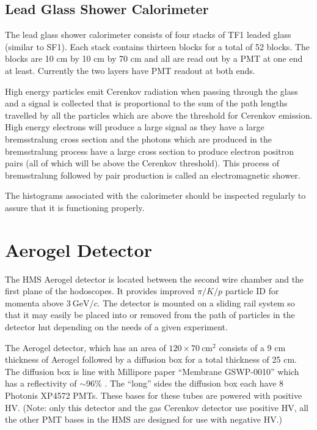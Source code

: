 \subsection{Lead Glass Shower Calorimeter}

The lead glass shower calorimeter consists of four stacks of
TF1 leaded glass (similar to SF1). Each stack contains thirteen
blocks for a total of 52 blocks. The blocks are 10 cm by 10 cm by 70
cm and all are read out by a PMT at one end at least.  Currently the
two layers have PMT readout at both ends.

High energy particles
emit Cerenkov radiation when passing through the glass and a signal
is collected that is proportional to the sum of the path lengths
travelled by all the
particles which are above the threshold for Cerenkov emission. High energy
electrons will produce a large signal as they have a large bremsstralung
cross section and the photons which are produced in the bremsstralung
process have a large cross section to produce electron positron pairs
(all of which will be above the Cerenkov threshold). This process
of bremsstralung followed by pair production is called an electromagnetic
shower.

The histograms associated with the calorimeter should be inspected
regularly to assure that it is functioning properly.

\section{Aerogel Detector}
The HMS Aerogel detector\cite{Asaturyan2005364} is located between the
second wire chamber and the first plane of the hodoscopes.  It
provides improved $\pi/K/p$ particle ID for momenta above
$3~\textrm{GeV}/c$.  The detector is mounted on a sliding rail system
so that it may easily be placed into or removed from the path of
particles in the detector hut depending on the needs of a given
experiment.

The Aerogel detector, which has an area of $120\times
70~\textrm{cm}^2$ consists of a 9 cm thickness of Aerogel followed by a
diffusion box for a total thickness of 25 cm. The diffusion box is
line with Millipore paper ``Membrane GSWP-0010'' which has a
reflectivity of $\sim 96\%$ \cite{millipore}.   The ``long'' sides the diffusion
box each have 8 Photonis XP4572 PMTs.  These bases for these tubes are
powered with positive HV.
(Note: only this detector and the gas Cerenkov detector
use positive HV, all the other PMT bases in the HMS are designed for
use with negative HV.)

